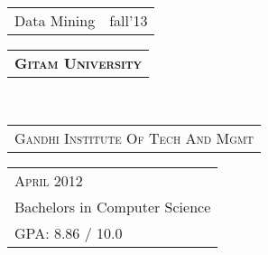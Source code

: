 \documentclass[10pt,a4paper,oneside]{article}
\begin{document}
\begin{minipage}[t]{0.33\textwidth}
\begin{adjustwidth}{7pt}{0pt}
\begin{tabular}{ll}
                { \footnotesize Data Mining } & {\footnotesize fall'13}\\
            \end{tabular}
        \end{adjustwidth}
        \vspace{10pt}
        \begin{tabular}{c}
            \textbf{\normalsize  G\textsc{itam} U\textsc{niversity}}
        \end{tabular}\\
        \textcolor{light-gray}{
            \begin{tabular}{l}
                {\small G\textsc{andhi} I\textsc{nstitute} O\textsc{f} T\textsc{ech} A\textsc{nd} M\textsc{gmt}}
            \end{tabular}
        } 
        \begin{tabular}{l}
            {\small A\textsc{pril} 2012}\\
            {\small Bachelors in Computer Science }\\
            {\small GPA: 8.86 / 10.0}
            \vspace{10pt}
        \end{tabular}\\
        \begin{comment}
        \textcolor{light-gray}{\textbf{\large S\textsc{kills}}}
        \vspace{-3pt}\\
        {\footnotesize
        \begin{tabular}{ll}
            \begin{tabular}{llll}\ &$\bullet$$\bullet$$\bullet$$\bullet$&$\bullet$$\bullet$$\bullet$$\bullet$&$\bullet$$\bullet$\\{\small
    \textbf{Languages}}&Java&Python&C++\end{tabular}\\[-0.2cm]
        \begin{tabular}{lll}\ &$\bullet$$\bullet$$\bullet$&$\bullet$$\bullet$\\{\small \textbf{Platforms}}&Amazon AWS&Google Cloud\end{tabular}\\[-0.2cm]
        \begin{tabular}{lll}\ &$\bullet$$\bullet$$\bullet$$\bullet$&$\bullet$$\bullet$$\bullet$$\bullet$\\{\small \textbf{OS}}&Linux&Windows\end{tabular}\\[-0.2cm]

\end{comment}
\end{minipage}
\end{document}
